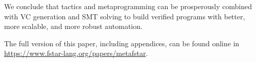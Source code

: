 \documentclass[runningheads]{llncs}
\newcommand\fstar{F$^\star$\xspace}
\newcommand\metafstar{Meta-F$^\star$\xspace}
\newcommand{\comm}[3]{\ifcheckpagebudget\else\ifdraft{{\color{#1}[#2: #3]}}\fi\fi}
\newcommand{\guido}[1]{\comm{blue}{Guido}{#1}}
\newcommand{\da}[1]{\comm{dkyellow}{Danel}{#1}}
\begin{document}
\medskip
We conclude that tactics and metaprogramming
can be prosperously combined with VC generation and SMT solving
to build verified programs
with better, more scalable, and more robust automation.

\medskip
The full version of this paper, including appendices, can be found online in
{\url{https://www.fstar-lang.org/papers/metafstar}}.







\end{document}
